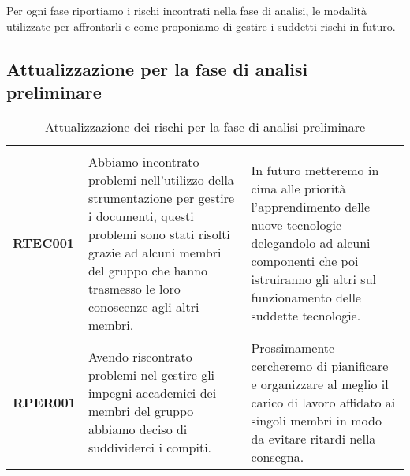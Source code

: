 \documentclass[../piano-di-progetto]{subfiles}
\begin{document}
Per ogni fase riportiamo i rischi incontrati nella fase di analisi, le modalità utilizzate per affrontarli e come proponiamo di gestire i suddetti rischi in futuro.

\subsection{Attualizzazione per la fase di analisi preliminare}%
\label{sub:attualizzazione_fase_analisi_preliminare}

\begin{longtable}[H]{|p{10em}|p{17em}|p{17em}|}
  \caption{Attualizzazione dei rischi per la fase di analisi preliminare}%
  \label{tab:attualizzazione_fase_analisi_preliminare}                                                                                                                                                                                                                                                                                                                                                                                                                         \\
  \rowcolor{darkgray!90!}
  \multicolumn{1}{c}{\color{white}{\textbf{Rischio}}} & \multicolumn{1}{c}{\color{white}{\textbf{Gestione}}}                                                                                                                                                                    & \multicolumn{1}{c}{\color{white}{\textbf{Monitoraggio}}}                                                                                                                                     \\
  \textbf{RTEC001}                                    & Abbiamo incontrato problemi nell'utilizzo della strumentazione per gestire i documenti, questi problemi sono stati risolti grazie ad alcuni membri del gruppo che hanno trasmesso le loro conoscenze agli altri membri. & In futuro metteremo in cima alle priorità l'apprendimento delle nuove tecnologie delegandolo ad alcuni componenti che poi istruiranno gli altri sul funzionamento delle suddette tecnologie. \\
  \textbf{RPER001}                                    & Avendo riscontrato problemi nel gestire gli impegni accademici dei membri del gruppo abbiamo deciso di suddividerci i compiti.                                                                                          & Prossimamente cercheremo di pianificare e organizzare al meglio il carico di lavoro affidato ai singoli membri in modo da evitare ritardi nella consegna.                                    \\

\end{longtable}
\end{document}
